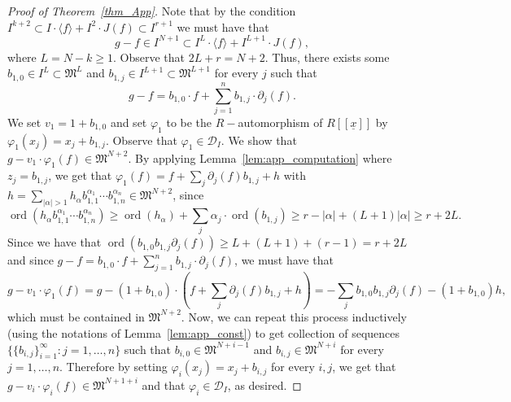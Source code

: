 \documentclass{article}
\DeclareMathOperator{\ord}{ord}
\numberwithin{theorem}{section}
\begin{document}
\begin{proof}[Proof of Theorem~\ref{thm_App}]
    Note that by the condition $I^{k+2} \subset I \cdot \langle f \rangle + I^2 \cdot J(f) \subset I^{r+1}$ we must have that 
    \begin{equation*}
        g-f \in I^{N+1} \subset I^L \cdot \langle f \rangle + I^{L+1} \cdot J(f),
    \end{equation*}
    \noindent where $L=N-k \geq 1$. Observe that $2L+r=N+2$.  Thus, there exists some $b_{1,0} \in I^L \subset \mathfrak{M}^L$ and $b_{1,j} \in I^{L+1} \subset \mathfrak{M}^{L+1}$ for every $j$ such that 
    \begin{equation*}
        g-f = b_{1,0} \cdot f + \sum_{j=1}^n b_{1,j} \cdot \partial_j (f).
    \end{equation*}
    \noindent We set $v_1=1+b_{1,0}$ and set $\varphi_1$ to be the $R-$automorphism of $R[[\underline{x}]]$ by $\varphi_1(x_j)=x_j+b_{1,j}$. Observe that $\varphi_1 \in \mathcal{D}_I$. We show that $g-v_1\cdot \varphi_1(f) \in \mathfrak{M}^{N+2}$. By applying Lemma~\ref{lem:app_computation} where $z_j=b_{1,j}$, we get that $\varphi_1(f)=f+\sum_j \partial_j(f) b_{1,j} +h$ with $h=\sum_{|\alpha|>1} h_\alpha b_{1,1}^{\alpha_1} \cdots b_{1,n}^{\alpha_n} \in \mathfrak{M}^{N+2}$, since 
    \begin{equation*}
        \ord(h_\alpha b_{1,1}^{\alpha_1} \cdots b_{1,n}^{\alpha_n}) \geq \ord(h_\alpha) + \sum_j \alpha_j \cdot \ord(b_{1,j}) \geq r-|\alpha|+(L+1)|\alpha|\geq r+2L. 
    \end{equation*}
    \noindent Since we have that $\ord(b_{1,0}b_{1,j}\partial_j(f)) \geq L+(L+1)+(r-1) = r+2L$ and since $g-f = b_{1,0} \cdot f + \sum_{j=1}^n b_{1,j} \cdot \partial_j (f)$, we must have that
    \begin{equation*}
        g-v_1\cdot \varphi_1(f)=g-(1+b_{1,0})\cdot(f+\sum_j\partial_j(f) b_{1,j} + h ) = -\sum_{j} b_{1,0}b_{1,j}\partial_j(f) - (1+b_{1,0})h, 
    \end{equation*}
    \noindent which must be contained in $\mathfrak{M}^{N+2}$.  Now, we can repeat this process inductively (using the notations of Lemma~\ref{lem:app_const}) to get collection of sequences $\{ \{b_{i,j}\}_{i=1}^\infty \colon j=1, \dots, n\}$ such that $b_{i,0} \in \mathfrak{M}^{N+i-1}$ and $b_{i,j} \in \mathfrak{M}^{N+i}$ for every $j=1, \dots, n$. Therefore by setting $\varphi_i(x_j) = x_j+b_{i,j}$ for every $i,j$, we get that $g-v_i\cdot \varphi_i(f) \in \mathfrak{M}^{N+1+i}$ and that $\varphi_i \in \mathcal{D}_I$, as desired.  
\end{proof}
\end{document}
